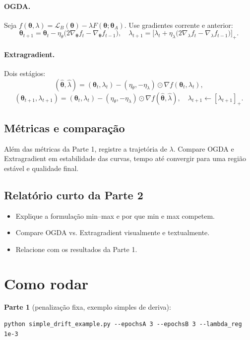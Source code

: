 \documentclass[9pt,a4paper]{extarticle}
\begin{document}
\paragraph{OGDA.}
Seja $f(\bm{\theta},\lambda)=\mathcal{L}_B(\bm{\theta})-\lambda F(\bm{\theta};\bm{\theta}_A)$.  
Use gradientes corrente e anterior:
\[
\bm{\theta}_{t+1} = \bm{\theta}_{t} - \eta_\theta\big(2\nabla_{\bm{\theta}} f_t - \nabla_{\bm{\theta}} f_{t-1}\big),\quad
\lambda_{t+1} = \big[\lambda_{t} + \eta_\lambda\big(2\nabla_{\lambda} f_t - \nabla_{\lambda} f_{t-1}\big)\big]_+.
\]

\paragraph{Extragradient.}
Dois estágios:
\[
(\hat{\bm{\theta}},\hat{\lambda}) = (\bm{\theta}_{t},\lambda_t) - (\eta_\theta,-\eta_\lambda)\odot \nabla f(\bm{\theta}_t,\lambda_t),
\]
\[
(\bm{\theta}_{t+1},\lambda_{t+1}) = (\bm{\theta}_{t},\lambda_t) - (\eta_\theta,-\eta_\lambda)\odot \nabla f(\hat{\bm{\theta}},\hat{\lambda}),
\quad \lambda_{t+1}\leftarrow[\lambda_{t+1}]_+.
\]

\subsection*{Métricas e comparação}
Além das métricas da Parte 1, registre a trajetória de $\lambda$. Compare OGDA e Extragradient em estabilidade das curvas, tempo até convergir para uma região estável e qualidade final.

\subsection*{Relatório curto da Parte 2}
\begin{itemize}
  \item Explique a formulação min–max e por que min e max competem.
  \item Compare OGDA vs. Extragradient visualmente e textualmente.
  \item Relacione com os resultados da Parte 1.
\end{itemize}

\section*{Como rodar}
\textbf{Parte 1} (penalização fixa, exemplo simples de deriva):
\begin{verbatim}
python simple_drift_example.py --epochsA 3 --epochsB 3 --lambda_reg 1e-3
\end{verbatim}
\end{document}
